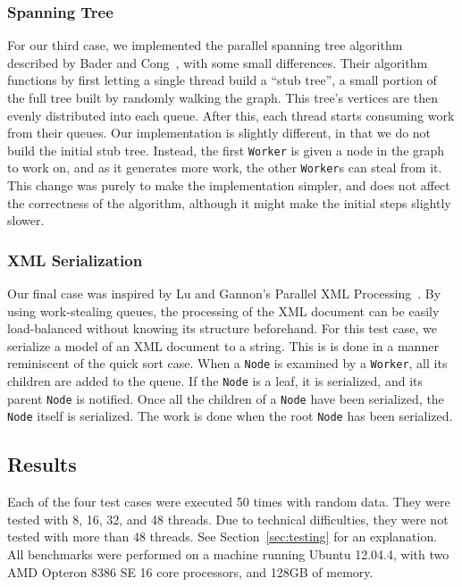 \subsubsection{Spanning Tree} %
For our third case, we implemented the parallel spanning tree algorithm
described by Bader and Cong~\cite{Bader04afast}, with some small differences.
Their algorithm functions by first letting a single thread build a ``stub
tree'', a small portion of the full tree built by randomly walking the graph.
This tree's vertices are then evenly distributed into each queue. After this,
each thread starts consuming work from their queues. Our implementation is
slightly different, in that we do not build the initial stub tree. Instead, the
first \texttt{Worker} is given a node in the graph to work on, and as it
generates more work, the other \texttt{Worker}s can steal from it. This change
was purely to make the implementation simpler, and does not affect the
correctness of the algorithm, although it might make the initial steps slightly
slower.

\subsubsection{XML Serialization} %
Our final case was inspired by Lu and Gannon's Parallel XML
Processing~\cite{Lu:2007:PXP:1272457.1272462}. By using work-stealing queues,
the processing of the XML document can be easily load-balanced without knowing
its structure beforehand. For this test case, we serialize a model of an XML
document to a string. This is is done in a manner reminiscent of the quick sort
case. When a \texttt{Node} is examined by a \texttt{Worker}, all its children
are added to the queue. If the \texttt{Node} is a leaf, it is serialized, and
its parent \texttt{Node} is notified. Once all the children of a \texttt{Node}
have been serialized, the \texttt{Node} itself is serialized. The work is done
when the root \texttt{Node} has been serialized. 

\subsection{Results}
Each of the four test cases were executed 50 times with random data. They were
tested with 8, 16, 32, and 48 threads. Due to technical difficulties, they were
not tested with more than 48 threads. See Section~\ref{sec:testing} for an
explanation. All benchmarks were performed on a machine running 
Ubuntu 12.04.4, with two AMD Opteron 8386 SE 16 core processors, and 128GB of
memory.

